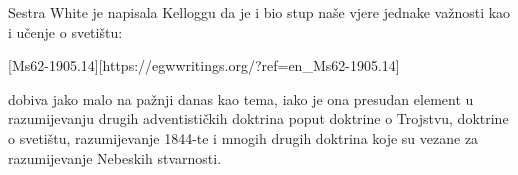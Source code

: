 Sestra White je napisala Kelloggu da je  i  bio stup naše vjere jednake važnosti kao i učenje o svetištu:

[Ms62-1905.14][https://egwwritings.org/?ref=en\_Ms62-1905.14]

 dobiva jako malo na pažnji danas kao tema, iako je ona presudan element u razumijevanju drugih adventističkih doktrina poput doktrine o Trojstvu, doktrine o svetištu, razumijevanje 1844-te i mnogih drugih doktrina koje su vezane za razumijevanje Nebeskih stvarnosti.


